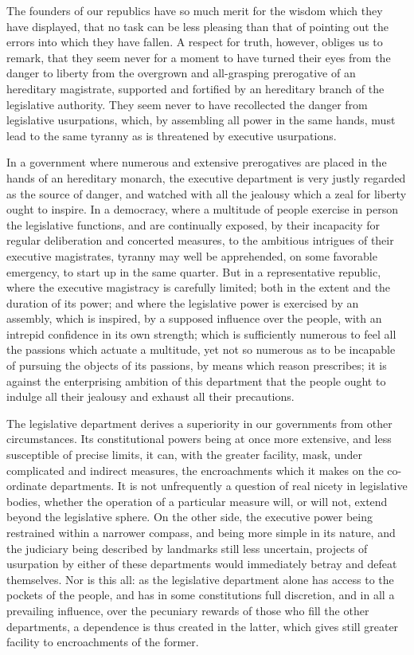 The founders of our republics have so much merit for the wisdom which they have displayed, that no task can be less pleasing than that of pointing out the errors into which they have fallen. A respect for truth, however, obliges us to remark, that they seem never for a moment to have turned their eyes from the danger to liberty from the overgrown and all-grasping prerogative of an hereditary magistrate, supported and fortified by an hereditary branch of the legislative authority. They seem never to have recollected the danger from legislative usurpations, which, by assembling all power in the same hands, must lead to the same tyranny as is threatened by executive usurpations.

In a government where numerous and extensive prerogatives are placed in the hands of an hereditary monarch, the executive department is very justly regarded as the source of danger, and watched with all the jealousy which a zeal for liberty ought to inspire. In a democracy, where a multitude of people exercise in person the legislative functions, and are continually exposed, by their incapacity for regular deliberation and concerted measures, to the ambitious intrigues of their executive magistrates, tyranny may well be apprehended, on some favorable emergency, to start up in the same quarter. But in a representative republic, where the executive magistracy is carefully limited; both in the extent and the duration of its power; and where the legislative power is exercised by an assembly, which is inspired, by a supposed influence over the people, with an intrepid confidence in its own strength; which is sufficiently numerous to feel all the passions which actuate a multitude, yet not so numerous as to be incapable of pursuing the objects of its passions, by means which reason prescribes; it is against the enterprising ambition of this department that the people ought to indulge all their jealousy and exhaust all their precautions.

The legislative department derives a superiority in our governments from other circumstances. Its constitutional powers being at once more extensive, and less susceptible of precise limits, it can, with the greater facility, mask, under complicated and indirect measures, the encroachments which it makes on the co-ordinate departments. It is not unfrequently a question of real nicety in legislative bodies, whether the operation of a particular measure will, or will not, extend beyond the legislative sphere. On the other side, the executive power being restrained within a narrower compass, and being more simple in its nature, and the judiciary being described by landmarks still less uncertain, projects of usurpation by either of these departments would immediately betray and defeat themselves. Nor is this all: as the legislative department alone has access to the pockets of the people, and has in some constitutions full discretion, and in all a prevailing influence, over the pecuniary rewards of those who fill the other departments, a dependence is thus created in the latter, which gives still greater facility to encroachments of the former.

